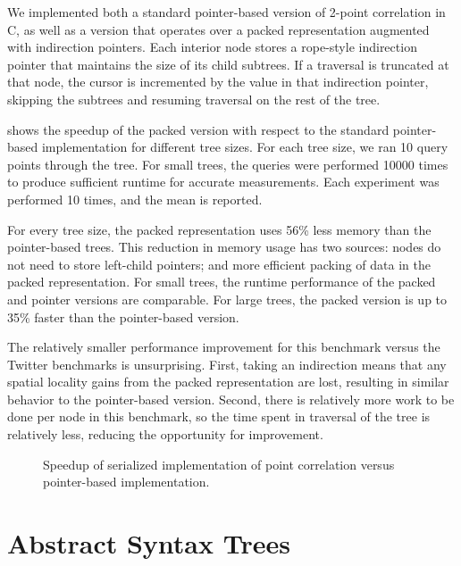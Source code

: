 \documentclass[showabstract,showacknowledgments,showpreface,showdedication]{iuphd}
\theoremstyle{nonumberplain}
\begin{document}
We implemented both a standard pointer-based version of 2-point correlation in
C, as well as a version that operates over a packed representation augmented
with indirection pointers. Each interior node stores a rope-style
indirection pointer that maintains the size of its child subtrees. If a
traversal is truncated at that node, the cursor is incremented by the value in
that indirection pointer, skipping the subtrees and resuming traversal on the
rest of the tree.

 shows the speedup of the packed version
with respect to the standard pointer-based implementation for
different tree sizes. For each tree size, we ran 10 query points
through the tree. For small trees, the queries were performed 10000
times to produce sufficient runtime for accurate measurements. Each
experiment was performed 10 times, and the mean is reported.

For every tree size, the packed representation uses 56\% less memory
than the pointer-based trees. This reduction in memory usage has two
sources: nodes do not need to store left-child pointers; and more
efficient packing of data in the packed representation. For small
trees, the runtime performance of the packed and pointer versions are
comparable. For large trees, the packed version is up to 35\% faster
than the pointer-based version. 

The relatively smaller performance improvement for this
benchmark versus the Twitter benchmarks is unsurprising. First, taking an
indirection means that any spatial locality gains from the packed
representation are lost, resulting in similar behavior to the
pointer-based version. Second, there is relatively more work to be
done per node in this benchmark, so the time spent in traversal of the
tree is relatively less, reducing the opportunity for improvement.


\begin{figure}
  \centering
  
  \label{fig:point_corr_plot}
  \caption{Speedup of serialized implementation of point correlation versus
    pointer-based implementation.}
\end{figure}

\section{Abstract Syntax Trees}

\end{document}
